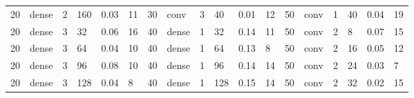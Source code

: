\begin{table}[t!]
{\begin{tabular}{@{}llllll|llllll|llllll@{}}
20                              & dense                          & 2                              & 160                            & 0.03                             & 11                                & 30                              & conv                           & 3                              & 40                             & 0.01                           & 12                                & 50                              & conv                           & 1                              & 40                             & 0.04                           & 19                               \\
20                              & dense                          & 3                              & 32                             & 0.06                             & 16                                & 40                              & dense                          & 1                              & 32                             & 0.14                           & 11                                & 50                              & conv                           & 2                              & 8                              & 0.07                           & 15                               \\
20                              & dense                          & 3                              & 64                             & 0.04                             & 10                                & 40                              & dense                          & 1                              & 64                             & 0.13                           & 8                                 & 50                              & conv                           & 2                              & 16                             & 0.05                           & 12                               \\
20                              & dense                          & 3                              & 96                             & 0.08                             & 10                                & 40                              & dense                          & 1                              & 96                             & 0.14                           & 14                                & 50                              & conv                           & 2                              & 24                             & 0.03                           & 7                                \\
20                              & dense                          & 3                              & 128                            & 0.04                             & 8                                 & 40                              & dense                          & 1                              & 128                            & 0.15                           & 14                                & 50                              & conv                           & 2                              & 32                             & 0.02                           & 15                               \\

\end{tabular}}
\end{table}
